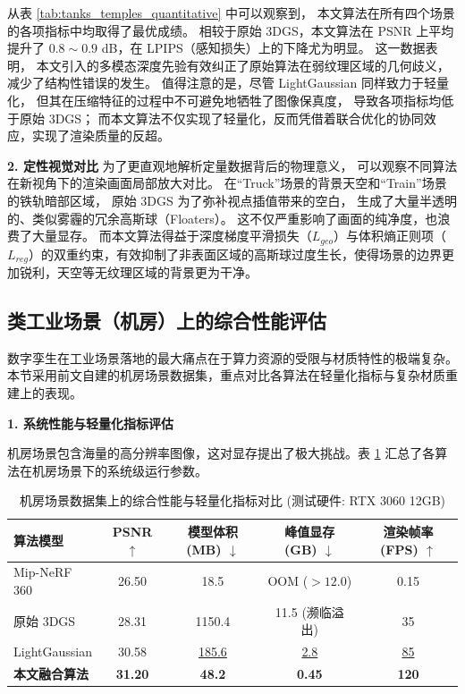 从表 \ref{tab:tanks_temples_quantitative} 中可以观察到，
本文算法在所有四个场景的各项指标中均取得了最优成绩。
相较于原始 3DGS，本文算法在 PSNR 上平均提升了 $0.8 \sim 0.9$ dB，在 LPIPS（感知损失）上的下降尤为明显。
这一数据表明，
本文引入的多模态深度先验有效纠正了原始算法在弱纹理区域的几何歧义，
减少了结构性错误的发生。
值得注意的是，尽管 LightGaussian 同样致力于轻量化，
但其在压缩特征的过程中不可避免地牺牲了图像保真度，
导致各项指标均低于原始 3DGS；
而本文算法不仅实现了轻量化，反而凭借着联合优化的协同效应，实现了渲染质量的反超。

\textbf{2. 定性视觉对比}
为了更直观地解析定量数据背后的物理意义，
可以观察不同算法在新视角下的渲染画面局部放大对比。
在“Truck”场景的背景天空和“Train”场景的铁轨暗部区域，
原始 3DGS 为了弥补视点插值带来的空白，
生成了大量半透明的、类似雾霾的冗余高斯球（Floaters）。
这不仅严重影响了画面的纯净度，也浪费了大量显存。
而本文算法得益于深度梯度平滑损失（$L_{geo}$）与体积熵正则项（$L_{reg}$）的双重约束，有效抑制了非表面区域的高斯球过度生长，使得场景的边界更加锐利，天空等无纹理区域的背景更为干净。

\subsection{类工业场景（机房）上的综合性能评估}
\label{subsec:server_room_results}

数字孪生在工业场景落地的最大痛点在于算力资源的受限与材质特性的极端复杂。本节采用前文自建的机房场景数据集，重点对比各算法在轻量化指标与复杂材质重建上的表现。

\textbf{1. 系统性能与轻量化指标评估}

机房场景包含海量的高分辨率图像，这对显存提出了极大挑战。表 \ref{tab:server_room_performance} 汇总了各算法在机房场景下的系统级运行参数。

\begin{table}[htbp]
    \centering
    \caption{机房场景数据集上的综合性能与轻量化指标对比 (测试硬件: RTX 3060 12GB)}
    \label{tab:server_room_performance}
    \renewcommand{\arraystretch}{1.2}
    \begin{tabular}{lcccc}
        \toprule
        \textbf{算法模型} & \textbf{PSNR $\uparrow$} & \textbf{模型体积 (MB) $\downarrow$} & \textbf{峰值显存 (GB) $\downarrow$} & \textbf{渲染帧率 (FPS) $\uparrow$} \\
        \midrule
        Mip-NeRF 360 & 26.50 & 18.5 & OOM ($>12.0$) & 0.15 \\
        原始 3DGS & 28.31 & 1150.4 & 11.5 (濒临溢出) & 35 \\
        LightGaussian & 30.58 & \underline{185.6} & \underline{2.8} & \underline{85} \\
        \rowcolor{gray!10}
        \textbf{本文融合算法} & \textbf{31.20} & \textbf{48.2} & \textbf{0.45} & \textbf{120} \\
        \bottomrule
    \end{tabular}
\end{table}

